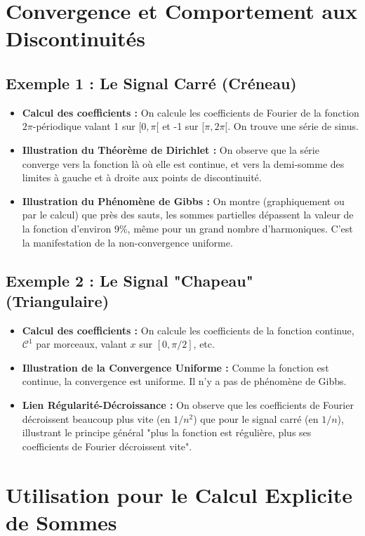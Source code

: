 \documentclass[12pt, a4paper, parskip=full]{report}
\theoremstyle{agregstyle}
\begin{document}
\section{Convergence et Comportement aux Discontinuités}
\subsection{Exemple 1 : Le Signal Carré (Créneau)}
\begin{itemize}
    \item \textbf{Calcul des coefficients :} On calcule les coefficients de Fourier de la fonction $2\pi$-périodique valant 1 sur $[0,\pi[$ et -1 sur $[\pi, 2\pi[$. On trouve une série de sinus.
    \item \textbf{Illustration du Théorème de Dirichlet :} On observe que la série converge vers la fonction là où elle est continue, et vers la demi-somme des limites à gauche et à droite aux points de discontinuité.
    \item \textbf{Illustration du Phénomène de Gibbs :} On montre (graphiquement ou par le calcul) que près des sauts, les sommes partielles dépassent la valeur de la fonction d'environ 9\%, même pour un grand nombre d'harmoniques. C'est la manifestation de la non-convergence uniforme.
\end{itemize}
\subsection{Exemple 2 : Le Signal "Chapeau" (Triangulaire)}
\begin{itemize}
    \item \textbf{Calcul des coefficients :} On calcule les coefficients de la fonction continue, $\mathcal{C}^1$ par morceaux, valant $x$ sur $[0, \pi/2]$, etc.
    \item \textbf{Illustration de la Convergence Uniforme :} Comme la fonction est continue, la convergence est uniforme. Il n'y a pas de phénomène de Gibbs.
    \item \textbf{Lien Régularité-Décroissance :} On observe que les coefficients de Fourier décroissent beaucoup plus vite (en $1/n^2$) que pour le signal carré (en $1/n$), illustrant le principe général "plus la fonction est régulière, plus ses coefficients de Fourier décroissent vite".
\end{itemize}

\section{Utilisation pour le Calcul Explicite de Sommes}
\end{document}
